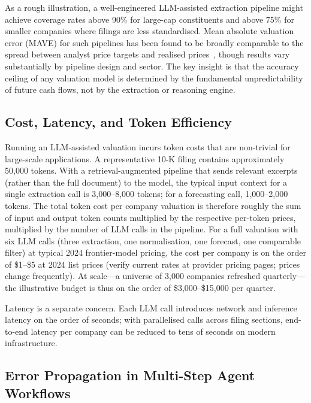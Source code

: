 \begin{deepdive}
As a rough illustration, a well-engineered LLM-assisted extraction pipeline might achieve coverage rates above 90\% for large-cap constituents and above 75\% for smaller companies where filings are less standardised. Mean absolute valuation error (MAVE) for such pipelines has been found to be broadly comparable to the spread between analyst price targets and realised prices~\citep{zhang2024financebench}, though results vary substantially by pipeline design and sector.
The key insight is that the accuracy ceiling of any valuation model is determined by
the fundamental unpredictability of future cash flows, not by the extraction or
reasoning engine.

\subsection{Cost, Latency, and Token Efficiency}
\label{subsec:bv-efficiency-cost}

Running an LLM-assisted valuation incurs token costs that are non-trivial for
large-scale applications. A representative 10-K filing contains approximately
50{,}000 tokens. With a retrieval-augmented pipeline that sends relevant excerpts
(rather than the full document) to the model, the typical input context for a
single extraction call is 3{,}000--8{,}000 tokens; for a forecasting call,
1{,}000--2{,}000 tokens. The total token cost per company valuation is therefore roughly the sum of input and output token counts multiplied by the respective per-token prices, multiplied by the number of LLM calls in the pipeline. For a full
valuation with six LLM calls (three extraction, one normalisation, one forecast,
one comparable filter) at typical 2024 frontier-model pricing, the cost per company is on the order of \$1--\$5 at 2024 list prices (verify current rates at provider pricing pages; prices change frequently). At scale---a universe of 3{,}000 companies refreshed quarterly---the illustrative budget is thus on the order of \$3{,}000--\$15{,}000 per quarter.

Latency is a separate concern. Each LLM call introduces network and inference latency on the order of seconds; with parallelised calls across filing sections, end-to-end latency per company can be reduced to tens of seconds on modern infrastructure.

\subsection{Error Propagation in Multi-Step Agent Workflows}
\label{subsec:bv-efficiency-errors}


\end{deepdive}
